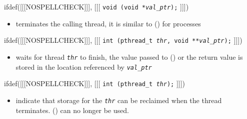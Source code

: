 \begin{slide}
ifdef([[[NOSPELLCHECK]]], [[[
\texttt{void (void *\emph{val\_ptr});}
]]])
\begin{itemize}
\item terminates the calling thread, it is similar to () for
processes
\end{itemize}
ifdef([[[NOSPELLCHECK]]], [[[
\texttt{int (pthread\_t \emph{thr},
void **\emph{val\_ptr});}
]]])
\begin{itemize}
\item waits for thread \emph{\texttt{thr}} to finish, the value passed to
() or the return value is stored in the location referenced
by \emph{\texttt{val\_ptr}}
\end{itemize}
ifdef([[[NOSPELLCHECK]]], [[[
\texttt{int (pthread\_t \emph{thr});}
]]])
\begin{itemize}
\item indicate that storage for the \emph{\texttt{thr}} can be reclaimed when
the thread terminates. () can no longer be used.
\end{itemize}
\end{slide}

